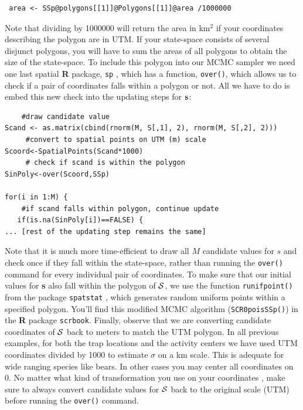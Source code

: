 \begin{verbatim}
 area <- SSp@polygons[[1]]@Polygons[[1]]@area /1000000
\end{verbatim}

 Note that dividing by 1000000 will return the area in km$^2$ if your coordinates describing the polygon are in UTM. If your state-space consists of several disjunct polygons, you will have to sum the areas of all polygons to obtain the size of the state-space.
To include this polygon into our MCMC sampler we need one last spatial 
{\bf R} package, \mbox{\tt sp} \citep{pebesma_bivand:2011}, which has a 
function, \verb#over()#, which allows us to check if a pair of coordinates 
falls within a polygon or not. All we have to do is embed this new check 
into the updating steps for ${\bf s}$:
\begin{verbatim}
    #draw candidate value
Scand <- as.matrix(cbind(rnorm(M, S[,1], 2), rnorm(M, S[,2], 2)))
     #convert to spatial points on UTM (m) scale
Scoord<-SpatialPoints(Scand*1000)   
     # check if scand is within the polygon
SinPoly<-over(Scoord,SSp)		

for(i in 1:M) {
    #if scand falls within polygon, continue update
   if(is.na(SinPoly[i])==FALSE) {		
... [rest of the updating step remains the same]
\end{verbatim}
Note that it is much more time-efficient to draw all $M$ candidate values 
for $s$ and check once if they fall within the state-space, rather than 
running the \verb#over()# command for every individual pair of 
coordinates. To make sure that our initial values for {\bf s} also fall 
within the polygon of ${\cal S}$, we use the function \verb#runifpoint()# 
from the package \mbox{\tt spatstat} \citep{baddeley_turner:2005}, 
which generates random uniform points within a specified polygon. You'll 
find this modified MCMC algorithm (\mbox{\tt SCR0poisSSp()}) in the {\bf R} 
package \mbox{\tt scrbook}.
Finally, observe that we are converting candidate coordinates of ${\cal S}$ 
back to meters to match the UTM polygon. In all previous examples, 
for both the trap locations and the activity centers we have used UTM 
coordinates divided by 1000 to estimate $\sigma$ on a km scale. This is 
adequate for wide ranging species like bears. In other cases you 
may center all coordinates on 0. No matter what kind of transformation you 
use on your coordinates , make sure to always convert candidate values for 
${\cal S}$ back to the original scale (UTM) before running the 
\verb#over()# command.

